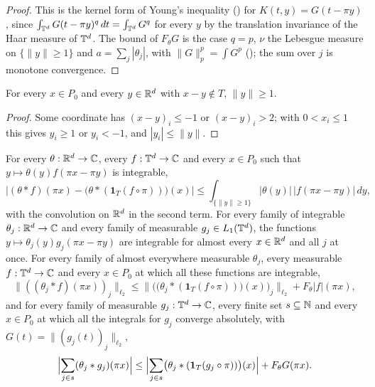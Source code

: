 \begin{proof}
\leanok
This is the kernel form of Young's inequality () for
$K(t, y) = G(t - \pi y)$, since $\int_{\mathbb{T}^d} G(t - \pi y)^q \, dt = \int_{\mathbb{T}^d} G^q$ for every
$y$ by the translation invariance of the Haar measure of $\mathbb{T}^d$. The
bound of $F_\theta G$ is the case $q = p$, $\nu$ the Lebesgue measure on $\{\|y\| \geq 1\}$ and
$a = \sum_j |\theta_j|$, with $\|G\|_p^p = \int G^p$ (); the sum
over $j$ is monotone convergence.
\end{proof}

\begin{lemma}
\label{lem:torus-triple-box}
\leanok
{}
For every $x \in P_0$ and every $y \in \mathbb{R}^d$ with $x - y \notin T$, $\|y\| \geq 1$.
\end{lemma}

\begin{proof}
\leanok
Some coordinate has $(x - y)_i \leq -1$ or $(x - y)_i > 2$; with $0 < x_i \leq 1$ this gives
$y_i \geq 1$ or $y_i < -1$, and $|y_i| \leq \|y\|$.
\end{proof}

\begin{lemma}
\label{lem:torus-conv-localisation}
\leanok
{}
For every $\theta : \mathbb{R}^d \to \mathbb{C}$, every $f : \mathbb{T}^d \to \mathbb{C}$ and every $x \in P_0$ such that
$y \mapsto \theta(y) f(\pi x - \pi y)$ is integrable,
\[
  \bigl| (\theta * f)(\pi x) - \bigl(\theta * (\mathbf 1_T (f \circ \pi))\bigr)(x) \bigr|
  \leq \int_{\{\|y\| \geq 1\}} |\theta(y)| \, |f(\pi x - \pi y)| \, dy ,
\]
with the convolution on $\mathbb{R}^d$ in the second term. For every family of integrable
$\theta_j : \mathbb{R}^d \to \mathbb{C}$ and every family of measurable $g_j \in L_1(\mathbb{T}^d)$, the functions
$y \mapsto \theta_j(y) g_j(\pi x - \pi y)$ are integrable for almost every $x \in \mathbb{R}^d$ and all
$j$ at once. For every family of almost everywhere measurable $\theta_j$, every measurable
$f : \mathbb{T}^d \to \mathbb{C}$ and every $x \in P_0$ at which all these functions are integrable,
\[
  \|((\theta_j * f)(\pi x))_j\|_{\ell_2}
  \leq \bigl\| \bigl(\bigl(\theta_j * (\mathbf 1_T (f \circ \pi))\bigr)(x)\bigr)_j \bigr\|_{\ell_2}
  + F_\theta |f| (\pi x) ,
\]
and for every family of measurable $g_j : \mathbb{T}^d \to \mathbb{C}$, every finite set $s \subseteq \mathbb{N}$ and
every $x \in P_0$ at which all the integrals for $g_j$ converge absolutely, with
$G(t) = \|(g_j(t))_j\|_{\ell_2}$,
\[
  \Bigl| \sum_{j \in s} (\theta_j * g_j)(\pi x) \Bigr|
  \leq \Bigl| \sum_{j \in s} \bigl(\theta_j * (\mathbf 1_T (g_j \circ \pi))\bigr)(x) \Bigr|
  + F_\theta G (\pi x) .
\]
\end{lemma}

